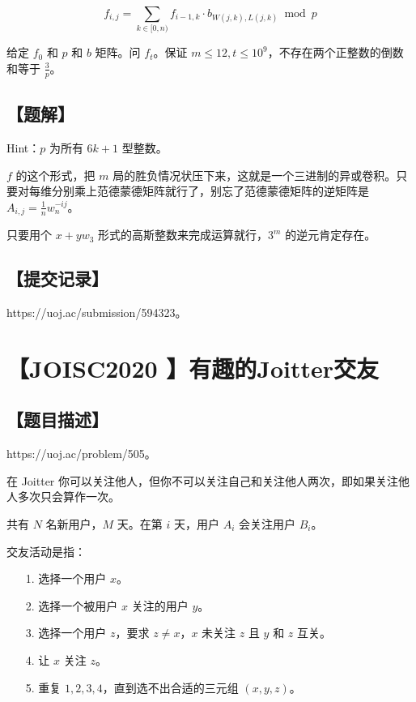 \documentclass[UTF8,12pt,a4paper]{ctexart}
\begin{document}
	$$
	f_{i,j}=\sum_{k\in[0,n)} f_{i-1,k}\cdot b_{W(j,k),L(j,k)} \bmod p
	$$
	
	给定 $f_0$ 和 $p$ 和 $b$ 矩阵。问 $f_t$。保证 $m\le 12,t\le 10^9$，不存在两个正整数的倒数和等于 $\frac{3}p$。
	
	\subsection*{【题解】}
	
	Hint：$p$ 为所有 $6k+1$ 型整数。
	
	$f$ 的这个形式，把 $m$ 局的胜负情况状压下来，这就是一个三进制的异或卷积。只要对每维分别乘上范德蒙德矩阵就行了，别忘了范德蒙德矩阵的逆矩阵是 $A_{i,j}=\frac 1n w_n^{-ij}$。
	
	只要用个 $x+yw_3$ 形式的高斯整数来完成运算就行，$3^m$ 的逆元肯定存在。
	
	\subsection*{【提交记录】}
	
	https://uoj.ac/submission/594323。
	
	
	\section*{【JOISC2020 】有趣的Joitter交友}
	
	\subsection*{【题目描述】}
	
	https://uoj.ac/problem/505。
	
	在 Joitter 你可以关注他人，但你不可以关注自己和关注他人两次，即如果关注他人多次只会算作一次。
	
	共有 $N$ 名新用户，$M$ 天。在第 $i$ 天，用户 $A_i$ 会关注用户 $B_i$。
	
	交友活动是指：
	
	\begin{itemize}
		\item[1.]选择一个用户 $x$。
		\item[2.]选择一个被用户 $x$ 关注的用户 $y$。
		\item[3.]选择一个用户 $z$，要求 $z\not=x$，$x$ 未关注 $z$ 且 $y$ 和 $z$ 互关。
		\item[4.]让 $x$ 关注 $z$。
		\item[5.]重复 $1,2,3,4$，直到选不出合适的三元组 $(x,y,z)$。
	\end{itemize}
	
\end{document}
